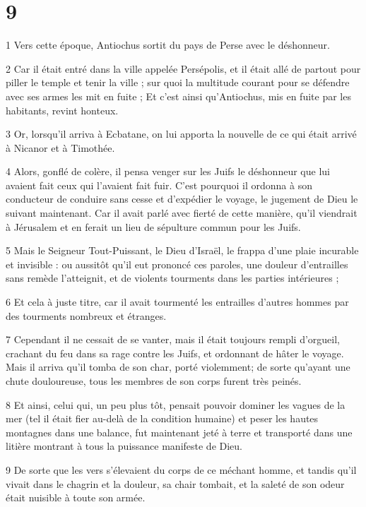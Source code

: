 \chapter{9}

\par 1 Vers cette époque, Antiochus sortit du pays de Perse avec le déshonneur.
\par 2 Car il était entré dans la ville appelée Persépolis, et il était allé de partout pour piller le temple et tenir la ville ; sur quoi la multitude courant pour se défendre avec ses armes les mit en fuite ; Et c'est ainsi qu'Antiochus, mis en fuite par les habitants, revint honteux.
\par 3 Or, lorsqu'il arriva à Ecbatane, on lui apporta la nouvelle de ce qui était arrivé à Nicanor et à Timothée.
\par 4 Alors, gonflé de colère, il pensa venger sur les Juifs le déshonneur que lui avaient fait ceux qui l'avaient fait fuir. C'est pourquoi il ordonna à son conducteur de conduire sans cesse et d'expédier le voyage, le jugement de Dieu le suivant maintenant. Car il avait parlé avec fierté de cette manière, qu'il viendrait à Jérusalem et en ferait un lieu de sépulture commun pour les Juifs.
\par 5 Mais le Seigneur Tout-Puissant, le Dieu d'Israël, le frappa d'une plaie incurable et invisible : ou aussitôt qu'il eut prononcé ces paroles, une douleur d'entrailles sans remède l'atteignit, et de violents tourments dans les parties intérieures ;
\par 6 Et cela à juste titre, car il avait tourmenté les entrailles d'autres hommes par des tourments nombreux et étranges.
\par 7 Cependant il ne cessait de se vanter, mais il était toujours rempli d'orgueil, crachant du feu dans sa rage contre les Juifs, et ordonnant de hâter le voyage. Mais il arriva qu'il tomba de son char, porté violemment; de sorte qu'ayant une chute douloureuse, tous les membres de son corps furent très peinés.
\par 8 Et ainsi, celui qui, un peu plus tôt, pensait pouvoir dominer les vagues de la mer (tel il était fier au-delà de la condition humaine) et peser les hautes montagnes dans une balance, fut maintenant jeté à terre et transporté dans une litière montrant à tous la puissance manifeste de Dieu.
\par 9 De sorte que les vers s'élevaient du corps de ce méchant homme, et tandis qu'il vivait dans le chagrin et la douleur, sa chair tombait, et la saleté de son odeur était nuisible à toute son armée.
